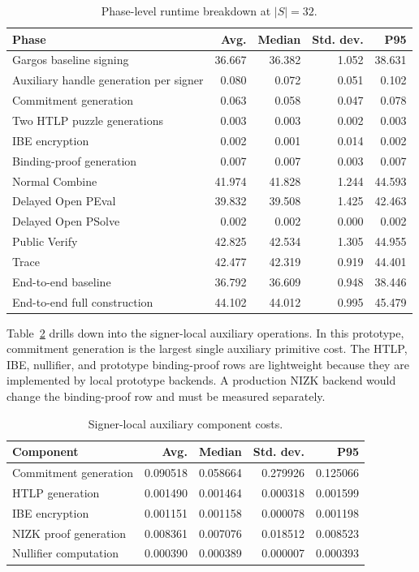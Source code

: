 \begin{table}[t]
\centering
\caption{Phase-level runtime breakdown at $|S|=32$.}
\label{tab:phase-breakdown}
\small
\begin{tabular}{lrrrr}
\toprule
Phase & Avg. & Median & Std. dev. & P95 \\
\midrule
Gargos baseline signing & 36.667 & 36.382 & 1.052 & 38.631 \\
Auxiliary handle generation per signer & 0.080 & 0.072 & 0.051 & 0.102 \\
Commitment generation & 0.063 & 0.058 & 0.047 & 0.078 \\
Two HTLP puzzle generations & 0.003 & 0.003 & 0.002 & 0.003 \\
IBE encryption & 0.002 & 0.001 & 0.014 & 0.002 \\
Binding-proof generation & 0.007 & 0.007 & 0.003 & 0.007 \\
Normal Combine & 41.974 & 41.828 & 1.244 & 44.593 \\
Delayed Open PEval & 39.832 & 39.508 & 1.425 & 42.463 \\
Delayed Open PSolve & 0.002 & 0.002 & 0.000 & 0.002 \\
Public Verify & 42.825 & 42.534 & 1.305 & 44.955 \\
Trace & 42.477 & 42.319 & 0.919 & 44.401 \\
End-to-end baseline & 36.792 & 36.609 & 0.948 & 38.446 \\
End-to-end full construction & 44.102 & 44.012 & 0.995 & 45.479 \\
\bottomrule
\end{tabular}
\end{table}

Table~\ref{tab:aux-components} drills down into the signer-local auxiliary
operations.  In this prototype, commitment generation is the largest single
auxiliary primitive cost.  The HTLP, IBE, nullifier, and prototype binding-proof
rows are lightweight because they are implemented by local prototype backends.
A production NIZK backend would change the binding-proof row and must be
measured separately.

\begin{table}[t]
\centering
\caption{Signer-local auxiliary component costs.}
\label{tab:aux-components}
\small
\begin{tabular}{lrrrr}
\toprule
Component & Avg. & Median & Std. dev. & P95 \\
\midrule
Commitment generation & 0.090518 & 0.058664 & 0.279926 & 0.125066 \\
HTLP generation & 0.001490 & 0.001464 & 0.000318 & 0.001599 \\
IBE encryption & 0.001151 & 0.001158 & 0.000078 & 0.001198 \\
NIZK proof generation & 0.008361 & 0.007076 & 0.018512 & 0.008523 \\
Nullifier computation & 0.000390 & 0.000389 & 0.000007 & 0.000393 \\
\bottomrule
\end{tabular}
\end{table}

